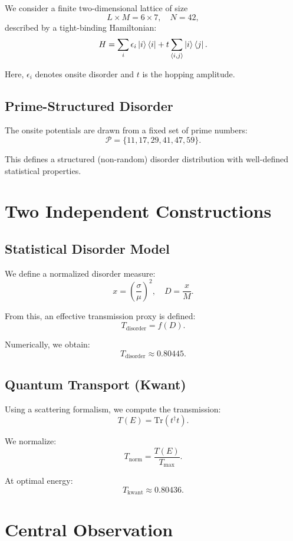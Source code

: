 \documentclass[11pt]{article}
\begin{document}
We consider a finite two-dimensional lattice of size
\[
L \times M = 6 \times 7, \quad N = 42,
\]
described by a tight-binding Hamiltonian:
\begin{equation}
H = \sum_i \epsilon_i \ket{i}\bra{i} + t \sum_{\langle i,j \rangle} \ket{i}\bra{j}.
\end{equation}

Here, $\epsilon_i$ denotes onsite disorder and $t$ is the hopping amplitude.

\subsection{Prime-Structured Disorder}

The onsite potentials are drawn from a fixed set of prime numbers:
\[
\mathcal{P} = \{11, 17, 29, 41, 47, 59\}.
\]

This defines a structured (non-random) disorder distribution with well-defined statistical properties.

\section{Two Independent Constructions}

\subsection{Statistical Disorder Model}

We define a normalized disorder measure:
\[
x = \left(\frac{\sigma}{\mu}\right)^2, \quad D = \frac{x}{M}.
\]

From this, an effective transmission proxy is defined:
\[
T_{\text{disorder}} = f(D).
\]

Numerically, we obtain:
\[
T_{\text{disorder}} \approx 0.80445.
\]

\subsection{Quantum Transport (Kwant)}

Using a scattering formalism, we compute the transmission:
\begin{equation}
T(E) = \mathrm{Tr}(t^\dagger t).
\end{equation}

We normalize:
\[
T_{\text{norm}} = \frac{T(E)}{T_{\max}}.
\]

At optimal energy:
\[
T_{\text{kwant}} \approx 0.80436.
\]

\section{Central Observation}
\end{document}
